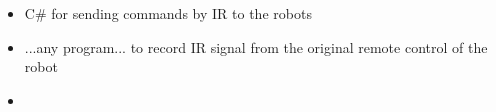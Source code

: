 \documentclass[documentation.tex]{subfiles}
\begin{document}
	\begin{itemize}
		\item C\# for sending commands by IR to the robots
		\item ...any program... to record IR signal from the original remote control of the robot
		\item 
	\end{itemize}
\end{document}
